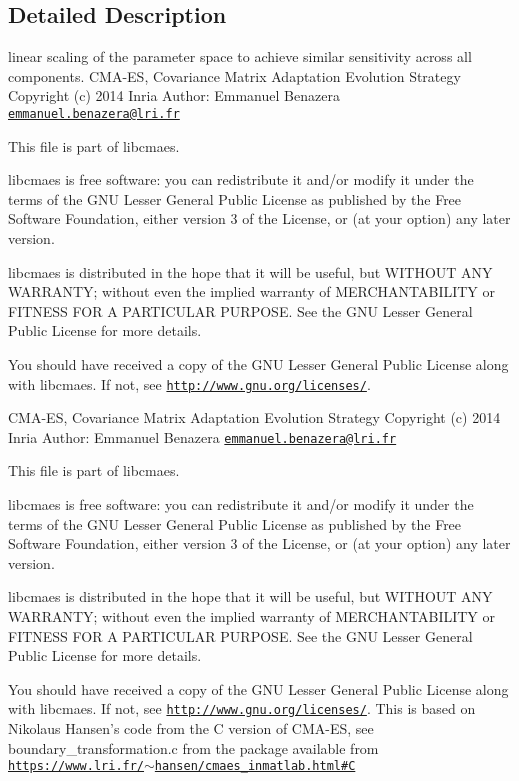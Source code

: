 \subsection{Detailed Description}
linear scaling of the parameter space to achieve similar sensitivity across all components. C\-M\-A-\/\-E\-S, Covariance Matrix Adaptation Evolution Strategy Copyright (c) 2014 Inria Author\-: Emmanuel Benazera \href{mailto:emmanuel.benazera@lri.fr}{\tt emmanuel.\-benazera@lri.\-fr}

This file is part of libcmaes.

libcmaes is free software\-: you can redistribute it and/or modify it under the terms of the G\-N\-U Lesser General Public License as published by the Free Software Foundation, either version 3 of the License, or (at your option) any later version.

libcmaes is distributed in the hope that it will be useful, but W\-I\-T\-H\-O\-U\-T A\-N\-Y W\-A\-R\-R\-A\-N\-T\-Y; without even the implied warranty of M\-E\-R\-C\-H\-A\-N\-T\-A\-B\-I\-L\-I\-T\-Y or F\-I\-T\-N\-E\-S\-S F\-O\-R A P\-A\-R\-T\-I\-C\-U\-L\-A\-R P\-U\-R\-P\-O\-S\-E. See the G\-N\-U Lesser General Public License for more details.

You should have received a copy of the G\-N\-U Lesser General Public License along with libcmaes. If not, see \href{http://www.gnu.org/licenses/}{\tt http\-://www.\-gnu.\-org/licenses/}.

C\-M\-A-\/\-E\-S, Covariance Matrix Adaptation Evolution Strategy Copyright (c) 2014 Inria Author\-: Emmanuel Benazera \href{mailto:emmanuel.benazera@lri.fr}{\tt emmanuel.\-benazera@lri.\-fr}

This file is part of libcmaes.

libcmaes is free software\-: you can redistribute it and/or modify it under the terms of the G\-N\-U Lesser General Public License as published by the Free Software Foundation, either version 3 of the License, or (at your option) any later version.

libcmaes is distributed in the hope that it will be useful, but W\-I\-T\-H\-O\-U\-T A\-N\-Y W\-A\-R\-R\-A\-N\-T\-Y; without even the implied warranty of M\-E\-R\-C\-H\-A\-N\-T\-A\-B\-I\-L\-I\-T\-Y or F\-I\-T\-N\-E\-S\-S F\-O\-R A P\-A\-R\-T\-I\-C\-U\-L\-A\-R P\-U\-R\-P\-O\-S\-E. See the G\-N\-U Lesser General Public License for more details.

You should have received a copy of the G\-N\-U Lesser General Public License along with libcmaes. If not, see \href{http://www.gnu.org/licenses/}{\tt http\-://www.\-gnu.\-org/licenses/}. This is based on Nikolaus Hansen's code from the C version of C\-M\-A-\/\-E\-S, see boundary\-\_\-transformation.\-c from the package available from \href{https://www.lri.fr/~hansen/cmaes_inmatlab.html#C}{\tt https\-://www.\-lri.\-fr/$\sim$hansen/cmaes\-\_\-inmatlab.\-html\#\-C} 